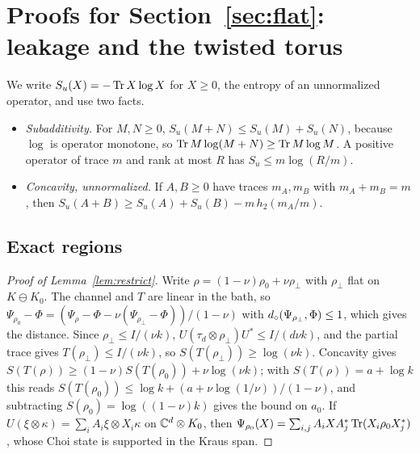\section{Proofs for Section~\ref{sec:flat}: leakage and the twisted torus}\label{app:flat}

We write $S_u(X)=-\operatorname{Tr} X\log X$ for $X\ge0$, the entropy of an unnormalized operator, and use two facts.
\begin{itemize}[leftmargin=2.8em]
\item[(F5)] \emph{Subadditivity.} For $M,N\ge0$, $S_u(M+N)\le S_u(M)+S_u(N)$, because $\log$ is operator monotone, so $\operatorname{Tr} M\log(M+N)\ge\operatorname{Tr} M\log M$. A positive
operator of trace $m$ and rank at most $R$ has $S_u\le m\log(R/m)$.
\item[(F6)] \emph{Concavity, unnormalized.} If $A,B\ge0$ have traces $m_A,m_B$ with $m_A+m_B=m$, then $S_u(A+B)\ge S_u(A)+S_u(B)-m\,h_2(m_A/m)$.
\end{itemize}

\subsection{Exact regions}

\begin{proof}[Proof of Lemma~\ref{lem:restrict}]
Write $\rho=(1-\nu)\rho_0+\nu\rho_\perp$ with $\rho_\perp$ flat on $K\ominus K_0$. The channel and $T$ are linear in the bath, so
$\Psi_{\rho_0}-\Phi=(\Psi_\rho-\Phi-\nu(\Psi_{\rho_\perp}-\Phi))/(1-\nu)$ with $d_\diamond(\Psi_{\rho_\perp},\Phi)\le1$, which gives the distance. Since $\rho_\perp\le I/(\nu k)$,
$U(\tau_d\otimes\rho_\perp)U^*\le I/(d\nu k)$, and the partial trace gives $T(\rho_\perp)\le I/(\nu k)$, so $S(T(\rho_\perp))\ge\log(\nu k)$. Concavity gives
$S(T(\rho))\ge(1-\nu)S(T(\rho_0))+\nu\log(\nu k)$; with $S(T(\rho))=a+\log k$ this reads $S(T(\rho_0))\le\log k+(a+\nu\log(1/\nu))/(1-\nu)$, and subtracting
$S(\rho_0)=\log((1-\nu)k)$ gives the bound on $a_0$. If $U(\xi\otimes\kappa)=\sum_iA_i\xi\otimes X_i\kappa$ on $\mathbb C^d\otimes K_0$, then
$\Psi_{\rho_0}(X)=\sum_{i,j}A_iXA_j^*\operatorname{Tr}(X_i\rho_0X_j^*)$, whose Choi state is supported in the Kraus span.
\end{proof}

